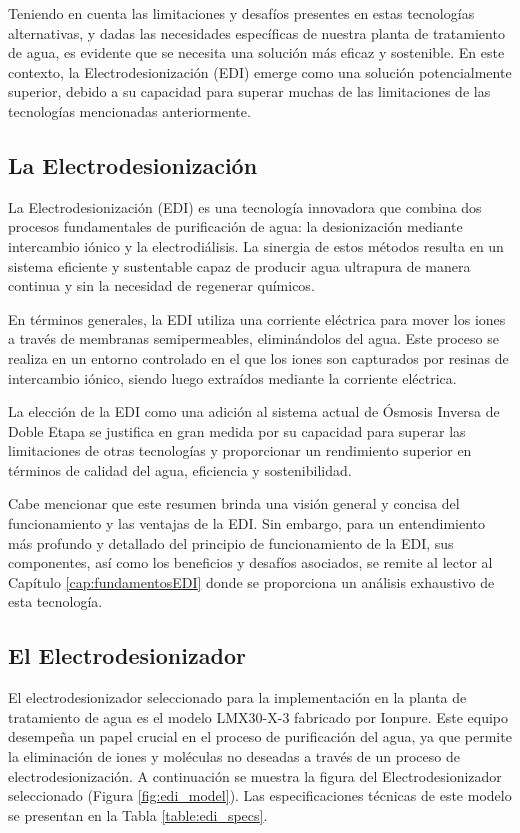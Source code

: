 Teniendo en cuenta las limitaciones y desafíos presentes en estas tecnologías alternativas, y
dadas las necesidades específicas de nuestra planta de tratamiento de agua, es evidente que se
necesita una solución más eficaz y sostenible. En este contexto, la Electrodesionización (EDI)
emerge como una solución potencialmente superior, debido a su capacidad para superar muchas de las
limitaciones de las tecnologías mencionadas anteriormente.

\subsection{La Electrodesionización}

La Electrodesionización (EDI) es una tecnología innovadora que combina dos procesos
fundamentales de purificación de agua: la desionización mediante intercambio iónico y
la electrodiálisis. La sinergia de estos métodos resulta en un sistema eficiente y
sustentable capaz de producir agua ultrapura de manera continua y sin la necesidad
de regenerar químicos.

En términos generales, la EDI utiliza una corriente eléctrica para mover los iones a
través de membranas semipermeables, eliminándolos del agua. Este proceso se realiza
en un entorno controlado en el que los iones son capturados por resinas de intercambio
iónico, siendo luego extraídos mediante la corriente eléctrica.

La elección de la EDI como una adición al sistema actual de Ósmosis Inversa de Doble
Etapa se justifica en gran medida por su capacidad para superar las limitaciones de
otras tecnologías y proporcionar un rendimiento superior en términos de calidad del
agua, eficiencia y sostenibilidad.

Cabe mencionar que este resumen brinda una visión general y concisa del funcionamiento y
las ventajas de la EDI. Sin embargo, para un entendimiento más profundo y detallado del
principio de funcionamiento de la EDI, sus componentes, así como los beneficios y
desafíos asociados, se remite al lector al Capítulo \ref{cap:fundamentosEDI} donde se proporciona un
análisis exhaustivo de esta tecnología.

\subsection{El Electrodesionizador}

El electrodesionizador seleccionado para la implementación en la planta de tratamiento de agua es el modelo LMX30-X-3 fabricado por Ionpure. Este equipo desempeña un papel crucial en el proceso de purificación del agua, ya que permite la eliminación de iones y moléculas no deseadas a través de un proceso de electrodesionización. A continuación se muestra la figura del Electrodesionizador seleccionado (Figura \ref{fig:edi_model}). Las especificaciones técnicas de este modelo se presentan en la Tabla \ref{table:edi_specs}.


